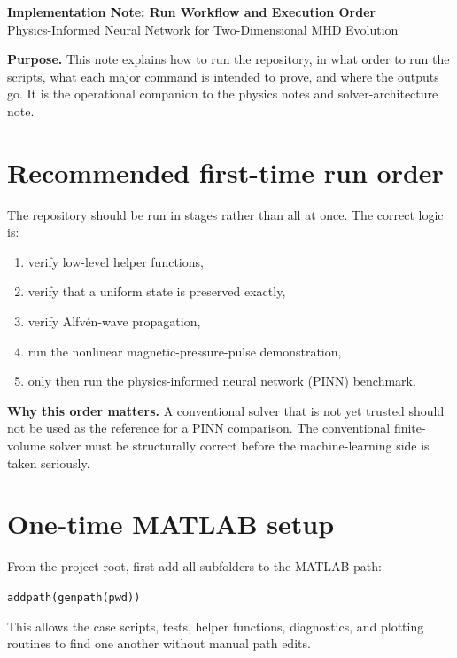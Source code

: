 \documentclass[11pt]{article}
\begin{document}
\begin{center}
    {\LARGE \bfseries \color{TitleBlue} Implementation Note: Run Workflow and Execution Order}\\[0.5em]
    {\large \color{AccentTeal} Physics-Informed Neural Network for Two-Dimensional MHD Evolution}
\end{center}

\vspace{0.5em}

\begin{overviewbox}
\textbf{Purpose.} This note explains how to run the repository, in what order to run the scripts, what each major command is intended to prove, and where the outputs go. It is the operational companion to the physics notes and solver-architecture note.
\end{overviewbox}

\section{Recommended first-time run order}
The repository should be run in stages rather than all at once. The correct logic is:
\begin{enumerate}[leftmargin=1.8em]
    \item verify low-level helper functions,
    \item verify that a uniform state is preserved exactly,
    \item verify Alfv\'en-wave propagation,
    \item run the nonlinear magnetic-pressure-pulse demonstration,
    \item only then run the physics-informed neural network (PINN) benchmark.
\end{enumerate}

\begin{implbox}
\textbf{Why this order matters.} A conventional solver that is not yet trusted should not be used as the reference for a PINN comparison. The conventional finite-volume solver must be structurally correct before the machine-learning side is taken seriously.
\end{implbox}

\section{One-time MATLAB setup}
From the project root, first add all subfolders to the MATLAB path:
\begin{center}
\texttt{addpath(genpath(pwd))}
\end{center}
This allows the case scripts, tests, helper functions, diagnostics, and plotting routines to find one another without manual path edits.
\end{document}
